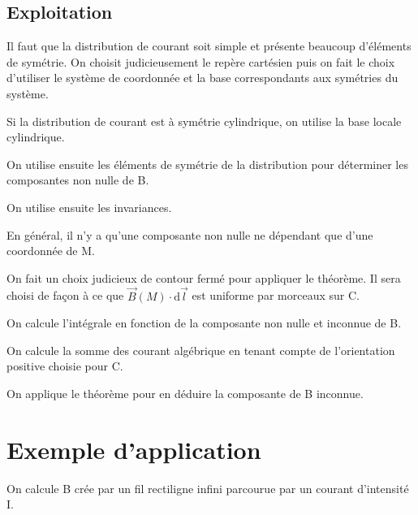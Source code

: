 \documentclass[french]{yLectureNote}
\renewcommand{\vec}{\overrightarrow}
\newcommand{\dd}{\mathrm{d}}
\newcommand{\B}{\vec{B}(M)}
\begin{document}
\subsection{Exploitation}
Il faut que la distribution de courant soit simple et présente beaucoup d'éléments de symétrie. On choisit judicieusement le repère cartésien puis on fait le choix d'utiliser le système de coordonnée et la base correspondants aux symétries du système.

Si la distribution de courant est à symétrie cylindrique, on utilise la base locale cylindrique.

On utilise ensuite les éléments de symétrie de la distribution pour déterminer les composantes non nulle de B.

On utilise ensuite les invariances.

En général, il n'y a qu'une composante non nulle ne dépendant que d'une coordonnée de M.

On fait un choix judicieux de contour fermé pour appliquer le théorème. Il sera choisi de façon à ce que \(\B\cdot \dd \vec{l}\) est uniforme par morceaux sur C.

On calcule l'intégrale en fonction de la composante non nulle et inconnue de B.

On calcule la somme des courant algébrique en tenant compte de l'orientation positive choisie pour C.

On applique le théorème pour en déduire la composante de B inconnue.

\section{Exemple d'application}
On calcule B crée par un fil rectiligne infini parcourue par un courant d'intensité I.
\end{document}
